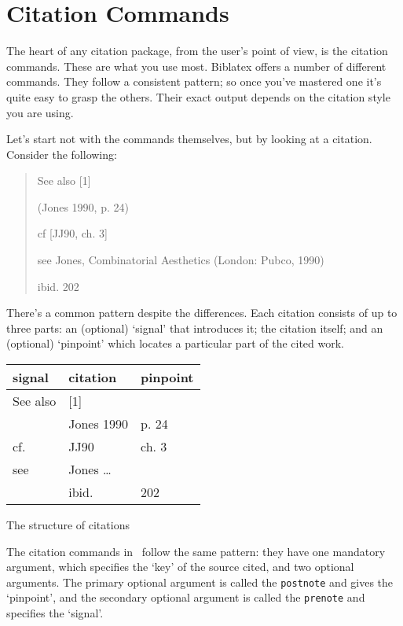 \chapter{Citation Commands}


The heart of any citation package, from the user’s point of view, is
the citation commands. These are what you use most. Biblatex offers a
number of different commands. They follow a consistent pattern; so
once you’ve mastered one it’s quite easy to grasp the others. Their
exact output depends on the citation style you are using.

Let’s start not with the commands themselves, but by looking at a
citation. Consider the following:

\begin{quote}
See also [1]

(Jones 1990, p. 24)

cf [JJ90, ch. 3]

see Jones, Combinatorial Aesthetics (London: Pubco, 1990)

ibid. 202
\end{quote}

There’s a common pattern despite the differences. Each citation
consists of up to three parts: an (optional) `signal' that introduces
it; the citation itself; and an (optional) `pinpoint' which locates a
particular part of the cited work.

\begin{margintable}
\begin{tabular}{lll}
\toprule
\textsf{signal} & \textsf{citation} & \textsf{pinpoint} \\
\midrule 
See also &   [1] \\
         &   Jones 1990   & p. 24 \\
cf.      &   JJ90         & ch. 3 \\
see      &   Jones \ldots\    \\ 
         &   ibid.        &  202 \\
\bottomrule
\end{tabular}
\caption{The structure of citations}
\end{margintable}

The citation commands in \biblatex\ follow the same pattern: they have
one mandatory argument, which specifies the `key' of the source cited,
and two optional arguments. The primary optional argument is called
the \texttt{postnote} and gives the `pinpoint', and the secondary optional
argument is called the \texttt{prenote} and specifies the `signal'.

